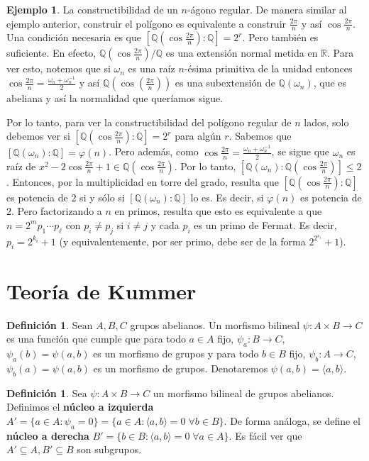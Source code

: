 \documentclass[12pt]{book}
\theoremstyle{definition}
\newtheorem{defn}[teo]{Definición}
\newtheorem{ex}[teo]{Ejemplo}
\newcommand{\RR}{\mathbb{R}}      %
\newcommand{\QQ}{\mathbb{Q}}
\begin{document}
\begin{ex}
La constructibilidad de un $n$-ágono regular. De manera similar al ejemplo anterior, construir el polígono es equivalente a construir $\frac{2\pi}{n}$ y así $\cos\frac{2\pi}{n}$. Una condición necesaria es que $[\QQ(\cos\frac{2\pi}{n}):\QQ]=2^r$. Pero también es suficiente. En efecto, $\QQ(\cos\frac{2\pi}{n})/\QQ$ es una extensión normal metida en $\RR$. Para ver esto, notemos que si $\omega_n$ es una raíz $n$-ésima primitiva de la unidad entonces $\cos \frac{2\pi}{n} = \frac{\omega_n + \omega_n^{-1}}{2}$ y así $\QQ(\cos(\frac{2\pi}{n}))$ es una subextensión de $\QQ(\omega_n)$, que es abeliana y así la normalidad que queríamos sigue.

Por lo tanto, para ver la constructibilidad del polígono regular de $n$ lados, solo debemos ver si $[\QQ(\cos\frac{2\pi}{n}):\QQ]=2^r$ para algún $r$. Sabemos que $[\QQ(\omega_n):\QQ]=\varphi(n)$. Pero además, como $\cos\frac{2\pi}{n} = \frac{\omega_n + \omega_n^{-1}}{2}$, se sigue que $\omega_n$ es raíz de $x^2 - 2\cos\frac{2\pi}{n} + 1\in\QQ(\cos\frac{2\pi}{n})$. Por lo tanto, $[\QQ(\omega_n):\QQ(\cos\frac{2\pi}{n})]\leq 2$. Entonces, por la multiplicidad en torre del grado, resulta que $[\QQ(\cos\frac{2\pi}{n}):\QQ]$ es potencia de $2$ si y sólo si $[\QQ(\omega_n):\QQ]$ lo es. Es decir, si $\varphi(n)$ es potencia de $2$. Pero factorizando a $n$ en primos, resulta que esto es equivalente a que $n = 2^m p_1\cdots p_\ell$ con $p_i\neq p_j$ si $i\neq j$ y cada $p_i$ es un primo de Fermat. Es decir, $p_i = 2^{k_i}+1$ (y equivalentemente, por ser primo, debe ser de la forma $2^{2^{s_i}}+1$).
\end{ex}

\section{Teoría de Kummer}

\begin{defn}
Sean $A,B,C$ grupos abelianos. Un morfismo bilineal $\psi:A\times B\to C$ es una función que cumple que para todo $a\in A$ fijo, $\psi_a:B\to C$, $\psi_a(b)=\psi(a,b)$ es un morfismo de grupos y para todo $b\in B$ fijo, $\psi_b:A\to C$, $\psi_b(a)=\psi(a,b)$ es un morfismo de grupos. Denotaremos $\psi(a,b)=\langle a,b\rangle$.
\end{defn}

\begin{defn}
Sea $\psi:A\times B\to C$ un morfismo bilineal de grupos abelianos. Definimos el \textbf{núcleo a izquierda} $A' = \{a\in A : \psi_a=0\}=\{a\in A : \langle a,b\rangle = 0\;\forall b\in B\}$. De forma análoga, se define el \textbf{núcleo a derecha} $B'=\{b\in B : \langle a,b\rangle = 0\;\forall a\in A\}$. Es fácil ver que $A'\subseteq A, B'\subseteq B$ son subgrupos.
\end{defn}
\end{document}

